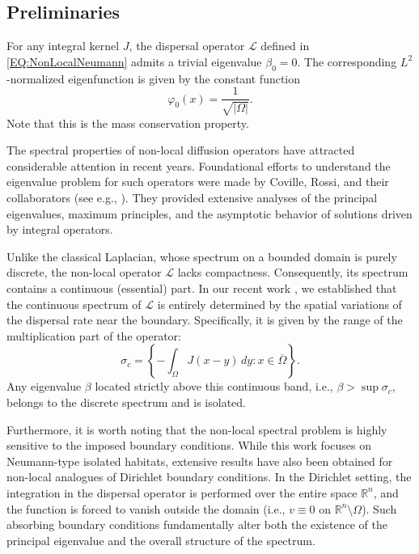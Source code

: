 \documentclass[11pt, a4paper]{article}
\theoremstyle{break}
\theoremstyle{break}
\theoremstyle{break}
\theoremstyle{break}
\theoremstyle{break}
\theoremstyle{break}
\theoremstyle{break}
\theoremstyle{break}
\theoremstyle{break}
\theoremstyle{break}
\begin{document}
\subsection{Preliminaries}

For any integral kernel $J$, the dispersal operator $\mathcal{L}$ defined in \eqref{EQ:NonLocalNeumann} admits a trivial eigenvalue $\beta_0 = 0$. The corresponding $L^2$-normalized eigenfunction is given by the constant function 
\begin{equation}
    \varphi_0(x) = \frac{1}{\sqrt{|\Omega|}}.
\end{equation}
Note that this is the mass conservation property.

The spectral properties of non-local diffusion operators have attracted considerable attention in recent years. Foundational efforts to understand the eigenvalue problem for such operators were made by Coville, Rossi, and their collaborators (see e.g., \cite{ChasseigneChavesRossi2006, Coville2010, GarciaMelianRossi2009}). They provided extensive analyses of the principal eigenvalues, maximum principles, and the asymptotic behavior of solutions driven by integral operators. 

Unlike the classical Laplacian, whose spectrum on a bounded domain is purely discrete, the non-local operator $\mathcal{L}$ lacks compactness. Consequently, its spectrum contains a continuous (essential) part. In our recent work \cite{Tadej2025}, we established that the continuous spectrum of $\mathcal{L}$ is entirely determined by the spatial variations of the dispersal rate near the boundary. Specifically, it is given by the range of the multiplication part of the operator:
\begin{equation}
    \sigma_c = \left\{ -\int_\Omega J(x-y) \,dy : x \in \overline{\Omega} \right\}.
\end{equation}
Any eigenvalue $\beta$ located strictly above this continuous band, i.e., $\beta > \sup \sigma_c$, belongs to the discrete spectrum and is isolated.

Furthermore, it is worth noting that the non-local spectral problem is highly sensitive to the imposed boundary conditions. While this work focuses on Neumann-type isolated habitats, extensive results have also been obtained for non-local analogues of Dirichlet boundary conditions. In the Dirichlet setting, the integration in the dispersal operator is performed over the entire space $\mathbb{R}^n$, and the function is forced to vanish outside the domain (i.e., $v \equiv 0$ on $\mathbb{R}^n \setminus \Omega$). Such absorbing boundary conditions fundamentally alter both the existence of the principal eigenvalue and the overall structure of the spectrum. 
\end{document}
